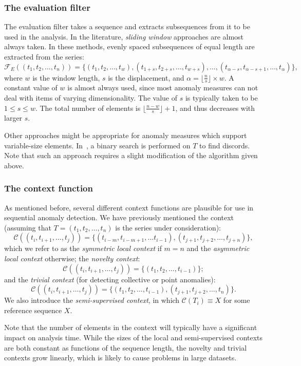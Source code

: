 \subsubsection{The evaluation filter}

The evaluation filter takes a sequence and extracts subsequences from it to be used in the analysis. In the literature, \emph{sliding window} approaches are almost always taken. In these methods, evenly spaced subsequences of equal length are extracted from the series:
\[
  \mathcal{F}_E((t_1, t_2, \dots, t_n)) = \{(t_1, t_2, \dots, t_w), (t_{1 + s}, t_{2+s}, \dots, t_{w+s}), \dots, (t_{\alpha-s}, t_{\alpha-s+1}, \dots, t_{\alpha})\},
\]
where $w$ is the window length, $s$ is the displacement, and $\alpha = \lfloor \frac{n}{s} \rfloor \times w$. A constant value of $w$ is almost always used, since most anomaly measures can not deal with items of varying dimensionality. The value of $s$ is typically taken to be $1 \leq s \leq w$. The total number of elements is $\lfloor \frac{n-w}{s} \rfloor + 1$, and thus decreases with larger $s$.

Other approaches might be appropriate for anomaly measures which support variable-size elements. In~\cite{keogh2}, a binary search is performed on $T$ to find discords. Note that such an approach requires a slight modification of the algorithm given above.

\subsubsection{The context function}
As mentioned before, several different context functions are plausible for use in sequential anomaly detection. We have previously mentioned the context (assuming that $T = (t_1, t_2, \dots, t_n)$ is the series under consideration):
\[
    \mathcal{C}((t_i, t_{i+1}, \dots, t_j)) = \{ (t_{i-m}, t_{i-m+1}, \dots t_{i-1}), (t_{j+1}, t_{j+2}, \dots, t_{j+n}) \},
\]
which we refer to as the \emph{symmetric local context} if $m = n$ and the \emph{asymmetric local context} otherwise; the \emph{novelty context}:
\[
    \mathcal{C}((t_i, t_{i+1}, \dots, t_j)) = \{ (t_1, t_2, \dots, t_{i-1}) \};
\]
and the \emph{trivial context} (for detecting collective or point anomalies):
\[
    \mathcal{C}((t_i, t_{i+1}, \dots, t_j)) = \{ (t_1, t_2, \dots, t_{i-1}), (t_{j+1}, t_{j+2}, \dots, t_n) \}.
\]
We also introduce the \emph{semi-supervised context}, in which $\mathcal{C}(T_i) \equiv X$ for some reference sequence $X$.

Note that the number of elements in the context will typically have a significant impact on analysis time. While the sizes of the local and semi-supervised contexts are both constant as functions of the sequence length, the novelty and trivial contexts grow linearly, which is likely to cause problems in large datasets.

